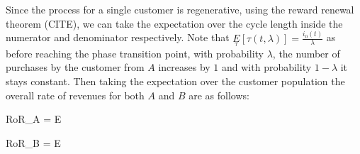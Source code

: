 Since the process for a single customer is regenerative, using the reward renewal theorem ({\nolan CITE}), we can take the expectation over the cycle length inside the numerator and denominator respectively.
Note that $\underset{\tau}E[\tau(t,\lambda)] = \frac{i_0(t)}{\lambda}$ as before reaching the phase transition point, with probability $\lambda$, the number of purchases by the customer from $A$ increases by $1$ and with probability $1-\lambda$ it stays constant.
Then taking the expectation over the customer population the overall rate of revenues for both $A$ and $B$ are as follows:

\beq
RoR_A = E
\eeq

\beq
RoR_B = E
\eeq
